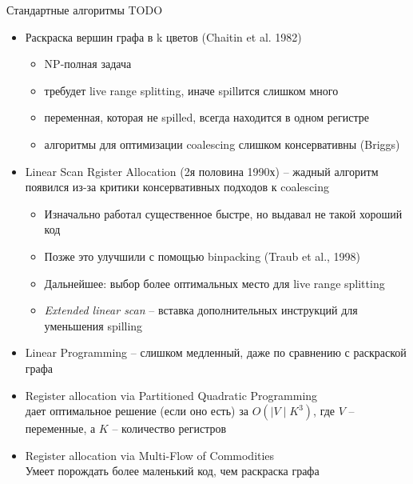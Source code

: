 \documentclass[aspectratio=169
  , xcolor={svgnames}
  , hyperref={ colorlinks,citecolor=DeepPink4
             , linkcolor=DarkRed,urlcolor=DarkBlue}
  , russian
  ]{beamer}
\theoremstyle{exerciseStyle1}
\begin{document}
\begin{frame}{Стандартные алгоритмы TODO}
\begin{itemize}
\item Раскраска вершин графа в k цветов (Chaitin et al. 1982)
\begin{itemize}
\item NP-полная задача
\item требудет live range splitting, иначе spillится слишком много
\item переменная, которая не spilled, всегда находится в одном регистре
\item алгоритмы для оптимизации coalescing слишком консервативны (Briggs)
\end{itemize}

\item Linear Scan Rgister Allocation (2я половина 1990х) -- жадный алгоритм\\
  появился из-за критики консервативных подходов к coalescing
\begin{itemize}
\item Изначально работал существенное быстре, но выдавал не такой хороший код
\item Позже это улучшили с помощью binpacking (Traub et al., 1998)
\item Дальнейшее: выбор более оптимальных место для live range splitting
\item \emph{Extended linear scan} -- вставка дополнительных инструкций для уменьшения spilling
\end{itemize}\end{itemize}
\end{frame}

\begin{frame}[fragile]{}
\begin{itemize}
\item Linear Programming -- слишком медленный, даже по сравнению с раскраской графа
\item Register allocation via Partitioned Quadratic Programming\\
  дает оптимальное решение (если оно есть) за $O(\mid V\mid K^3)$, где $V$ -- переменные, а $K$ -- количество регистров
  
\item Register allocation via Multi-Flow of Commodities\\
  Умеет порождать более маленький код, чем раскраска графа

\end{itemize}
\end{frame}
\end{document}
